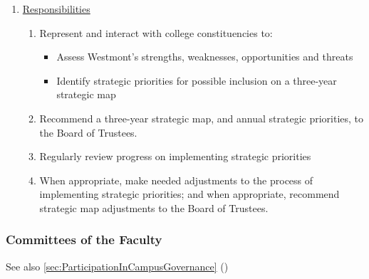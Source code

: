 \begin{enumerate}
					\item{\underline{Responsibilities}
						\begin{enumerate}
							\item{Represent and interact with college constituencies to:
								\begin{itemize}
									\item{ Assess Westmont's strengths, weaknesses,
										opportunities and threats}
									\item{ Identify strategic priorities for
										possible inclusion on a three-year strategic
										map}
								\end{itemize}
							}
							\item{ Recommend a three-year strategic map, and annual
								strategic priorities, to the Board of Trustees.}
							\item{ Regularly review progress on implementing
								strategic priorities}
							\item{ When appropriate, make needed adjustments to the
								process of implementing strategic priorities; and when
								appropriate, recommend strategic map adjustments to the
								Board of Trustees.}
						\end{enumerate}
					}
				\end{enumerate}
		\subsubsection{Committees of the Faculty}
			\label{sec:CommitteesOfTheFaculty}
			See also
			\ref{sec:ParticipationInCampusGovernance}
			()


